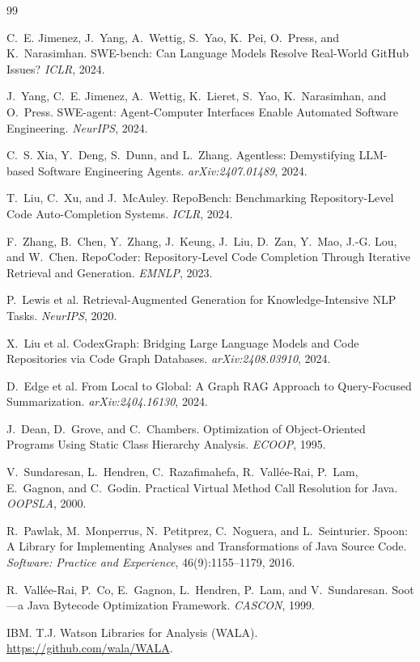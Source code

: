 \documentclass[11pt]{article}
\begin{document}
\begin{thebibliography}{99}
\small

 C.~E. Jimenez, J.~Yang, A.~Wettig, S.~Yao, K.~Pei, O.~Press,
and K.~Narasimhan. SWE-bench: Can Language Models Resolve Real-World GitHub
Issues? \emph{ICLR}, 2024.

 J.~Yang, C.~E. Jimenez, A.~Wettig, K.~Lieret, S.~Yao,
K.~Narasimhan, and O.~Press. SWE-agent: Agent-Computer Interfaces Enable Automated
Software Engineering. \emph{NeurIPS}, 2024.

 C.~S. Xia, Y.~Deng, S.~Dunn, and L.~Zhang. Agentless:
Demystifying LLM-based Software Engineering Agents. \emph{arXiv:2407.01489}, 2024.

 T.~Liu, C.~Xu, and J.~McAuley. RepoBench: Benchmarking
Repository-Level Code Auto-Completion Systems. \emph{ICLR}, 2024.

 F.~Zhang, B.~Chen, Y.~Zhang, J.~Keung, J.~Liu, D.~Zan,
Y.~Mao, J.-G. Lou, and W.~Chen. RepoCoder: Repository-Level Code Completion
Through Iterative Retrieval and Generation. \emph{EMNLP}, 2023.

 P.~Lewis et al. Retrieval-Augmented Generation for
Knowledge-Intensive NLP Tasks. \emph{NeurIPS}, 2020.

 X.~Liu et al. CodexGraph: Bridging Large Language Models and
Code Repositories via Code Graph Databases. \emph{arXiv:2408.03910}, 2024.

 D.~Edge et al. From Local to Global: A Graph RAG Approach to
Query-Focused Summarization. \emph{arXiv:2404.16130}, 2024.

 J.~Dean, D.~Grove, and C.~Chambers. Optimization of Object-Oriented
Programs Using Static Class Hierarchy Analysis. \emph{ECOOP}, 1995.

 V.~Sundaresan, L.~Hendren, C.~Razafimahefa, R.~Vall\'ee-Rai,
P.~Lam, E.~Gagnon, and C.~Godin. Practical Virtual Method Call Resolution for
Java. \emph{OOPSLA}, 2000.

 R.~Pawlak, M.~Monperrus, N.~Petitprez, C.~Noguera, and
L.~Seinturier. Spoon: A Library for Implementing Analyses and Transformations of
Java Source Code. \emph{Software: Practice and Experience}, 46(9):1155--1179, 2016.

 R.~Vall\'ee-Rai, P.~Co, E.~Gagnon, L.~Hendren, P.~Lam, and
V.~Sundaresan. Soot---a Java Bytecode Optimization Framework. \emph{CASCON}, 1999.

 IBM. T.J. Watson Libraries for Analysis (WALA).
\url{https://github.com/wala/WALA}.

\end{thebibliography}
\end{document}
